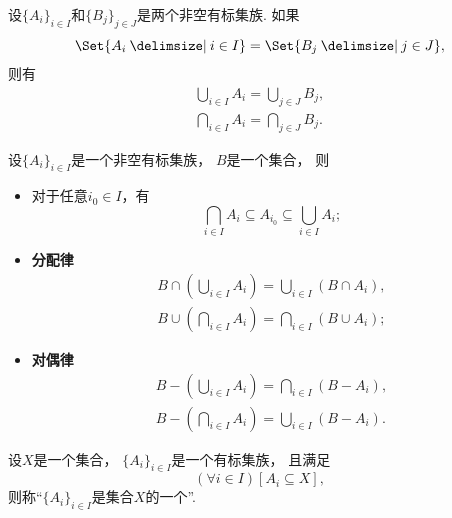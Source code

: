 \begin{theorem}
设\(\{A_i\}_{i \in I}\)和\(\{B_j\}_{j \in J}\)是两个非空有标集族.
如果\begin{equation*}
	\Set{ A_i \given i \in I }
	= \Set{ B_j \given j \in J },
\end{equation*}
则有\begin{gather}
	\bigcup_{i \in I} A_i = \bigcup_{j \in J} B_j, \\
	\bigcap_{i \in I} A_i = \bigcap_{j \in J} B_j.
\end{gather}
\end{theorem}

\begin{theorem}
设\(\{A_i\}_{i \in I}\)是一个非空有标集族，
\(B\)是一个集合，
则\begin{itemize}
	\item 对于任意\(i_0 \in I\)，有\begin{equation*}
		\bigcap_{i \in I} A_i \subseteq A_{i_0} \subseteq \bigcup_{i \in I} A_i;
	\end{equation*}

	\item {\rm\bf 分配律}\begin{gather*}
		B \cap \left( \bigcup_{i \in I} A_i \right)
		= \bigcup_{i \in I} \left( B \cap A_i \right), \\
		B \cup \left( \bigcap_{i \in I} A_i \right)
		= \bigcap_{i \in I} \left( B \cup A_i \right);
	\end{gather*}

	\item {\rm\bf 对偶律}\begin{gather*}
		B - \left( \bigcup_{i \in I} A_i \right)
		= \bigcap_{i \in I} \left( B - A_i \right), \\
		B - \left( \bigcap_{i \in I} A_i \right)
		= \bigcup_{i \in I} \left( B - A_i \right).
	\end{gather*}
\end{itemize}
\end{theorem}

\begin{definition}
设\(X\)是一个集合，
\(\{A_i\}_{i \in I}\)是一个有标集族，
且满足\begin{equation*}
	(\forall i \in I)
	[A_i \subseteq X],
\end{equation*}
则称“\(\{A_i\}_{i \in I}\)是集合\(X\)的一个”.
\end{definition}

